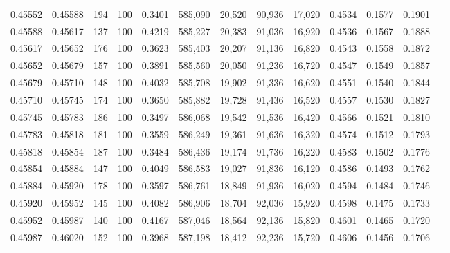 \begin{tabular}{rrrrrrrrrrrrr}
0.45552 & 0.45588 &   194 & 100 &                                     0.3401 & 585,090 &  20,520 &  90,936 &  17,020 & 0.4534 & 0.1577 & 0.1901 \\
0.45588 & 0.45617 &   137 & 100 &                                     0.4219 & 585,227 &  20,383 &  91,036 &  16,920 & 0.4536 & 0.1567 & 0.1888 \\
0.45617 & 0.45652 &   176 & 100 &                                     0.3623 & 585,403 &  20,207 &  91,136 &  16,820 & 0.4543 & 0.1558 & 0.1872 \\
0.45652 & 0.45679 &   157 & 100 &                                     0.3891 & 585,560 &  20,050 &  91,236 &  16,720 & 0.4547 & 0.1549 & 0.1857 \\
0.45679 & 0.45710 &   148 & 100 &                                     0.4032 & 585,708 &  19,902 &  91,336 &  16,620 & 0.4551 & 0.1540 & 0.1844 \\
0.45710 & 0.45745 &   174 & 100 &                                     0.3650 & 585,882 &  19,728 &  91,436 &  16,520 & 0.4557 & 0.1530 & 0.1827 \\
0.45745 & 0.45783 &   186 & 100 &                                     0.3497 & 586,068 &  19,542 &  91,536 &  16,420 & 0.4566 & 0.1521 & 0.1810 \\
0.45783 & 0.45818 &   181 & 100 &                                     0.3559 & 586,249 &  19,361 &  91,636 &  16,320 & 0.4574 & 0.1512 & 0.1793 \\
0.45818 & 0.45854 &   187 & 100 &                                     0.3484 & 586,436 &  19,174 &  91,736 &  16,220 & 0.4583 & 0.1502 & 0.1776 \\
0.45854 & 0.45884 &   147 & 100 &                                     0.4049 & 586,583 &  19,027 &  91,836 &  16,120 & 0.4586 & 0.1493 & 0.1762 \\
0.45884 & 0.45920 &   178 & 100 &                                     0.3597 & 586,761 &  18,849 &  91,936 &  16,020 & 0.4594 & 0.1484 & 0.1746 \\
0.45920 & 0.45952 &   145 & 100 &                                     0.4082 & 586,906 &  18,704 &  92,036 &  15,920 & 0.4598 & 0.1475 & 0.1733 \\
0.45952 & 0.45987 &   140 & 100 &                                     0.4167 & 587,046 &  18,564 &  92,136 &  15,820 & 0.4601 & 0.1465 & 0.1720 \\
0.45987 & 0.46020 &   152 & 100 &                                     0.3968 & 587,198 &  18,412 &  92,236 &  15,720 & 0.4606 & 0.1456 & 0.1706 \\

\end{tabular}

